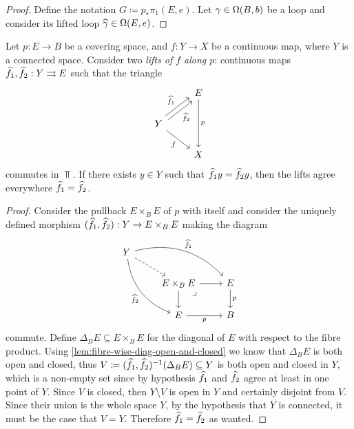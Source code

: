 \begin{proof}
    Define the notation \(G \coloneq p_{*} \pi_1(E, e)\). Let
    \(\gamma \in \operatorname{\Omega}(B, b)\) be a loop and consider its lifted loop
    \(\widehat \gamma \in \operatorname{\Omega}(E, e)\).
\end{proof}

\begin{theorem}
    \label{thm:lifting-out-of-connected-space}
    Let \(p: E \to B\) be a covering space, and \(f: Y \to X\) be a continuous map,
    where \(Y\) is a connected space. Consider two \emph{lifts of \(f\) along
        \(p\)}: continuous maps \(\widehat f_1, \widehat f_2: Y \rightrightarrows E\) such that
    the triangle
    \[
        \begin{tikzcd}
            &E \ar[dd, "p"] \\
            Y \ar[ru, shift left, "\lift f_1"]
            \ar[ru, shift right, "\lift f_2"']
            \ar[dr, "f"']
            &
            \\
            &X
        \end{tikzcd}
    \]
    commutes in \(\Top\). If there exists \(y \in Y\) such that
    \(\widehat f_1 y = \widehat f_2 y\), then the lifts agree everywhere
    \(\widehat f_1 = \widehat f_2\).
\end{theorem}

\begin{proof}
    Consider the pullback \(E \times_B E\) of \(p\) with itself and consider the
    uniquely defined morphism \((\widehat f_1, \widehat f_2): Y \to E \times_B E\)
    making the diagram
    \[
        \begin{tikzcd}
            Y \ar[rrd, bend left, "\lift{f}_1"]
            \ar[ddr, "\lift{f}_2"', bend right]
            \ar[rd, dashed]
            & &
            \\
            &E \times_B E \ar[r] \ar[d]
            \ar[rd, phantom, "\lrcorner", very near start]
            &E \ar[d, "p"]
            \\
            &E \ar[r, "p"']
            &B
        \end{tikzcd}
    \]
    commute. Define \(\Delta_B E \subseteq E \times_B E\) for the diagonal of \(E\)
    with respect to the fibre product. Using
    \cref{lem:fibre-wise-diag-open-and-closed} we know that \(\Delta_B E\) is both
    open and closed, thus
    \(V \coloneq (\widehat f_1, \widehat f_2)^{-1}(\Delta_B E) \subseteq Y\) is both
    open and closed in \(Y\), which is a non-empty set since by hypothesis
    \(\widehat f_1\) and \(\widehat f_2\) agree at least in one point of
    \(Y\). Since \(V\) is closed, then \(Y \setminus V\) is open in \(Y\) and
    certainly disjoint from \(V\). Since their union is the whole space \(Y\), by
    the hypothesis that \(Y\) is connected, it must be the case that \(V =
    Y\). Therefore \(\widehat f_1 = \widehat f_2\) as wanted.
\end{proof}


